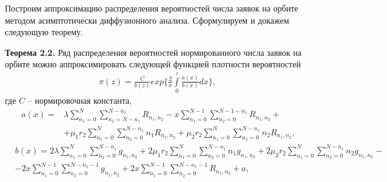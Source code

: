 Построим аппроксимацию распределения вероятностей числа заявок на орбите методом асимптотически диффузионного анализа. Сформулируем и докажем следующую теорему.

\textbf{ Теорема 2.2.} Ряд распределения вероятностей нормированного числа заявок на орбите можно аппроксимировать следующей функцией плотности вероятностей
\begin{align}
	\pi (z)= \frac{C}{b(z)}exp\bigg\{\frac{2}{\sigma} \int\limits_0^z \frac{a(x)}{b(x)}dx\bigg\},
\end{align} 
где  $C$ -- нормировочная константа,
\begin{equation*}
	\begin{aligned}\
		a(x)=&\lambda \sum_{n_1=0}^N\sum_{n_2=N-n_1}^{N-n_1} 
		R_{n_{1}, n_{2}}
		- x\sum_{n_1=0}^{N-1}\sum_{n_2=0}^{N-1-n_1} 
		R_{n_{1}, n_{2}}+\\
		&+\mu_1 r_2 \sum_{n_1=0}^{N}\sum_{n_2=0}^{N-n_1} 
		n_1 R_{n_{1}, n_{2}}
		+\mu_2 r_2 \sum_{n_1=0}^{N}\sum_{n_2=0}^{N-n_1} 
		n_2 R_{n_{1}, n_{2}},
	\end{aligned}
\end{equation*}
\begin{equation*}
	\begin{aligned}
		&b(x)=2\lambda\sum_{n_1=0}^N\sum_{n_2=0}^{N-n_1}g_{n_{1}, n_{2}}+2\mu_{1}r_{2}\sum_{n_1=0}^{N}\sum_{n_2=0}^{N-n_1}n_{1}g_{n_{1}, n_{2}}+2\mu_{2}r_{2}\sum_{n_1=0}^{N}\sum_{n_2=0}^{N-n_1}n_{2}g_{n_{1}, n_{2}}-\\
		&-2x\sum_{n_1=0}^{N-1}\sum_{n_2=0}^{N-n_1-1}g_{n_{1}, n_{2}}+2x\sum_{n_1=0}^{N-1}\sum_{n_2=0}^{N-n_1-1}R_{n_{1}, n_{2}}+a,
	\end{aligned}
\end{equation*}

